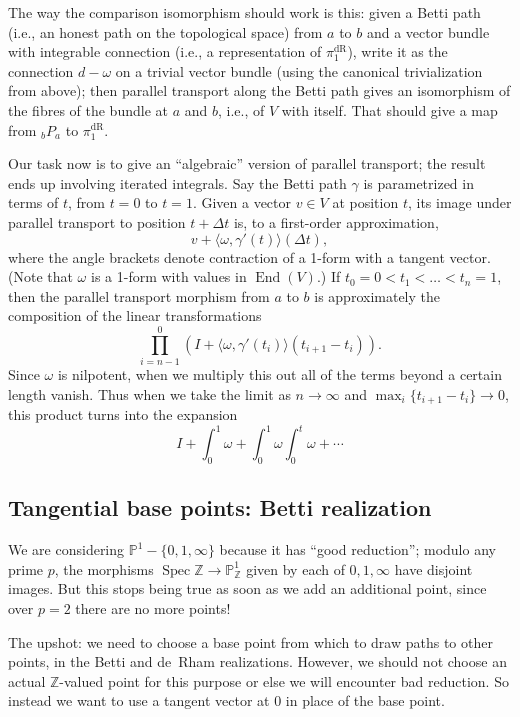 \documentclass[12pt]{article}
\def\PP{\mathbb{P}}
\def\ZZ{\mathbb{Z}}
\DeclareMathOperator{\dR}{dR}
\DeclareMathOperator{\End}{End}
\DeclareMathOperator{\Spec}{Spec}
\begin{document}
The way the comparison isomorphism should work is this: given a
Betti path (i.e., an honest path on the topological space) from $a$ to $b$
and a vector bundle with integrable connection (i.e.,
a representation of $\pi_1^{\dR}$), write it as the connection $d - \omega$
on a trivial vector bundle (using the canonical trivialization from above);
then parallel transport along the Betti path gives an isomorphism of 
the fibres of the bundle at $a$ and $b$, i.e., of $V$ with itself.
That should give a map from ${}_bP_a$ to $\pi_1^{\dR}$.

Our task now is to give an ``algebraic'' version of parallel transport;
the result ends up involving iterated integrals. Say the Betti path
$\gamma$ is parametrized in terms of $t$, from $t=0$ to $t=1$.
Given a vector $v \in V$ at position $t$, its image under parallel transport
to position $t + \Delta t$ is, to a first-order approximation,
\[
v + \langle \omega, \gamma'(t) \rangle (\Delta t),
\]
where the angle brackets denote contraction of a 1-form with a tangent
vector. (Note that $\omega$ is a 1-form with values in $\End(V)$.)
If $t_0 = 0 <  t_1 < \dots < t_n = 1$,
then the parallel transport morphism from $a$ to $b$ is approximately
the composition of the linear transformations
\[
\prod_{i=n-1}^0 (I + \langle \omega, \gamma'(t_i) \rangle (t_{i+1}-t_i)).
\]
Since $\omega$ is nilpotent, when we multiply this out all of the terms
beyond a certain length vanish. Thus when we take the limit as
$n \to \infty$ and $\max_i \{t_{i+1}-t_i\} \to 0$, this product
turns into the expansion
\[
I + \int_0^1 \omega + \int_0^1 \omega \int_0^t \omega + \cdots
\]

\subsection*{Tangential base points: Betti realization}

We are considering $\PP^1 - \{0, 1, \infty\}$ because it has
``good reduction''; modulo any prime $p$, the morphisms $\Spec \ZZ
\to \PP^1_\ZZ$ given by each of $0, 1, \infty$ have disjoint images.
But this stops being true as soon as we add an additional point,
since over $p=2$ there are no more points!

The upshot: we need to choose a base point from which to draw paths to other
points, in the Betti and de~Rham realizations. However, we should not choose
an actual $\ZZ$-valued point for this purpose or else we will encounter
bad reduction. So instead we want to use a tangent vector at $0$
in place of the base point.
\end{document}
